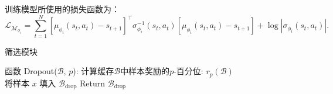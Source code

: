 训练模型所使用的损失函数为：
\begin{equation}
    \mathcal{L}_{\mathcal{M}_{\phi_i}} = \sum_{t=1}^N[\mu_{\phi_i}(s_t,a_t)-s_{t+1}]^\top\sigma_{\phi_i}^{-1}(s_t,a_t)
    [\mu_{\phi_i}(s_t,a_t)-s_{t+1}] + \log|\sigma_{\phi_i}(s_t,a_t)|.
\end{equation}

\begin{algorithm}[ht]
\caption{筛选模块}
\begin{algorithmic}
\STATE 函数 Dropout($\mathcal{B}$, $p$):
    \STATE 计算缓存$\mathcal{B}$中样本奖励的$p$-百分位: $r_p(\mathcal{B})$\\
            \STATE 将样本 $x$ 填入 $\mathcal{B}_{\mathrm{drop}}$
        \ENDIF
    \ENDFOR
    \STATE Return $\mathcal{B}_{\mathrm{drop}}$
\end{algorithmic}
\end{algorithm}

